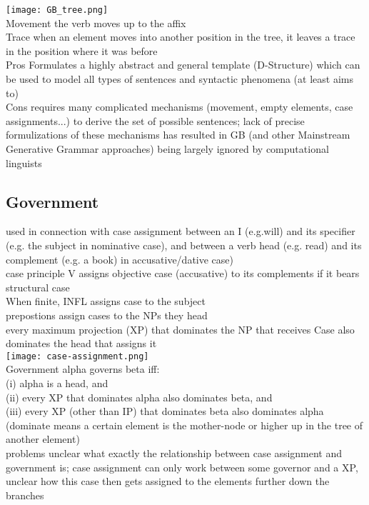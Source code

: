 \texttt{[image: GB\_tree.png]}\\
\scriptsize{Movement} 
{\tiny the verb moves up to the affix}\\
\scriptsize{Trace} 
{\tiny when an element moves into another position in the tree, it leaves a trace in the position where it was before}\\
\scriptsize{Pros} 
{\tiny Formulates a highly abstract and general template (D-Structure) which can be used to model all types of sentences and syntactic phenomena (at least aims to)}\\
\scriptsize{Cons} 
{\tiny requires many complicated mechanisms (movement, empty elements, case assignments...) to derive the set of possible sentences; lack of precise formulizations of these mechanisms has resulted in GB (and other Mainstream Generative Grammar approaches) being largely ignored by computational linguists}
\subsection*{Government}
{\tiny used in connection with case assignment between an I (e.g.will) and its specifier (e.g. the subject in nominative case), and between a verb head (e.g. read) and its complement (e.g. a book) in accusative/dative case)}\\
\scriptsize{case principle} {\tiny V assigns objective case (accusative) to its complements if it bears structural case\\
When finite, INFL assigns case to the subject\\
prepostions assign cases to the NPs they head\\
every maximum projection (XP) that dominates the NP that receives Case also dominates the head that assigns it
}\\
\texttt{[image: case-assignment.png]}\\
\scriptsize{Government} {\tiny alpha governs beta iff:\\
(i) alpha is a head, and \\
(ii) every XP that dominates alpha also dominates beta, and \\
(iii) every XP (other than IP) that dominates beta also dominates alpha\\
(dominate means a certain element is the mother-node or higher up in the tree of another element)
}\\
\scriptsize{problems} {\tiny unclear what exactly the relationship between case assignment and government is; case assignment can only work between some governor and a XP, unclear how this case then gets assigned to the elements further down the branches}
